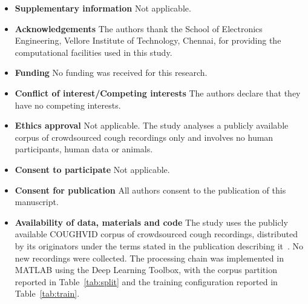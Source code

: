 \begin{itemize}
\item \textbf{Supplementary information} \; Not applicable.

\item \textbf{Acknowledgements} \; The authors thank the School of Electronics
Engineering, Vellore Institute of Technology, Chennai, for providing the
computational facilities used in this study.

\item \textbf{Funding} \; No funding was received for this research.

\item \textbf{Conflict of interest/Competing interests} \; The authors declare
that they have no competing interests.

\item \textbf{Ethics approval} \; Not applicable. The study analyses a
publicly available corpus of crowdsourced cough recordings only and involves
no human participants, human data or animals.

\item \textbf{Consent to participate} \; Not applicable.

\item \textbf{Consent for publication} \; All authors consent to the
publication of this manuscript.

\item \textbf{Availability of data, materials and code} \; The study uses the
publicly available COUGHVID corpus of crowdsourced cough recordings,
distributed by its originators under the terms stated in the publication
describing it~\cite{orlandic2021}. No new recordings were collected. The
processing chain was implemented in MATLAB using the Deep Learning Toolbox,
with the corpus partition reported in Table~\ref{tab:split} and the training
configuration reported in Table~\ref{tab:train}.
\end{itemize}


